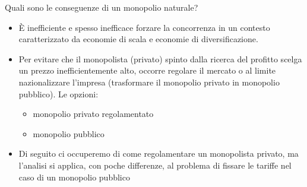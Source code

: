 \documentclass[aspectratio=149,11pt]{beamer}
\begin{document}
\begin{frame}{Quali sono le conseguenze di un monopolio naturale?}
\begin{itemize}
\item È inefficiente e spesso inefficace forzare la concorrenza in un contesto
caratterizzato da economie di scala e economie di diversificazione.

\item Per evitare che il monopolista (privato) spinto dalla ricerca del profitto
scelga un prezzo inefficientemente alto, occorre \alert{regolare} il mercato o al
limite \alert{nazionalizzare} l'impresa (trasformare il monopolio privato in
monopolio pubblico). Le opzioni:
\begin{itemize}
\item monopolio privato regolamentato
\item monopolio pubblico
\end{itemize}

\item Di seguito ci occuperemo di come regolamentare un monopolista privato, ma
l'analisi si applica, con poche differenze, al problema di fissare le
tariffe nel caso di un monopolio pubblico
\end{itemize}
\end{frame}
\end{document}
